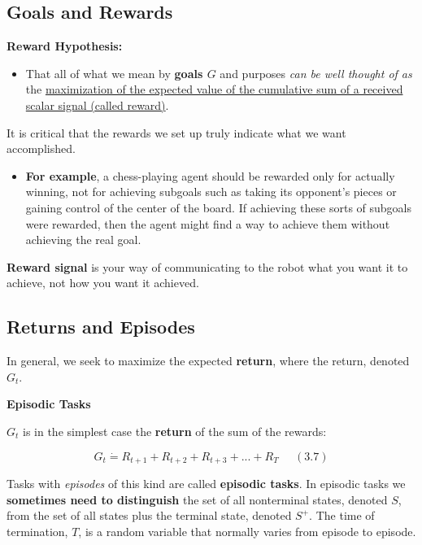 \documentclass[12pt, a4paper]{article}
\begin{document}
\subsection{Goals and Rewards}\label{goals-and-rewards}

\textbf{Reward Hypothesis:}

\begin{itemize}
\item
  That all of what we mean by \textbf{goals $G$} and purposes \emph{can be well thought of as} the \uline{maximization of the expected value of the cumulative sum of a received scalar signal (called reward)}.
\end{itemize}

It is critical that the rewards we set up truly indicate what we want
accomplished.

\begin{itemize}
  \item \textbf{For example}, a chess-playing agent should be
  rewarded only for actually winning, not for achieving subgoals such as
  taking its opponent's pieces or gaining control of the center of the
  board. If achieving these sorts of subgoals were rewarded, then the
  agent might find a way to achieve them without achieving the real goal.
\end{itemize}

\textbf{Reward signal} is your way of communicating to the robot what
you want it to achieve, not how you want it achieved.







\subsection{Returns and Episodes }\label{returns-and-episodes}

In general, we seek to maximize the expected \textbf{return}, where the
return, denoted \(G_t\).

\textbf{Episodic Tasks}\label{episodic-tasks}

\(G_t\) is in the simplest case the \textbf{return} of the sum of the
rewards:

\[G_t \dot{=} R_{t+1} + R_{t+2} + R_{t+3} + ... + R_T \;\;\;\;\;(3.7)\]

Tasks with \emph{episodes} of this kind are called \textbf{episodic
tasks}. In episodic tasks we \textbf{sometimes need to distinguish} the
set of all nonterminal states, denoted \(S\), from the set of all states
plus the terminal state, denoted \(S^+\). The time of termination,
\(T\), is a random variable that normally varies from episode to
episode.
\end{document}
